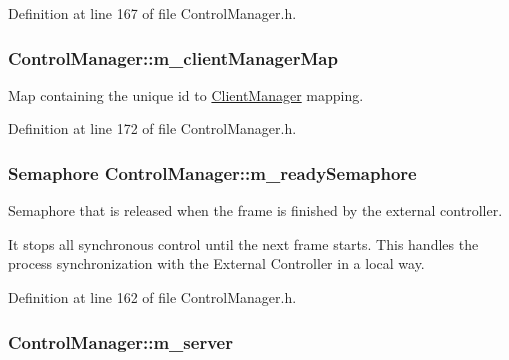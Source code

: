Definition at line 167 of file Control\-Manager.\-h.

\hypertarget{class_control_manager_af47dee5a077190c6aeb7b9ef3d9cfb3b}{
\subsubsection[{m\-\_\-client\-Manager\-Map}]{ Control\-Manager\-::m\-\_\-client\-Manager\-Map\hspace{0.3cm}{\ttfamily [private]}}}\label{class_control_manager_af47dee5a077190c6aeb7b9ef3d9cfb3b}


Map containing the unique id to \hyperlink{class_client_manager}{Client\-Manager} mapping. 



Definition at line 172 of file Control\-Manager.\-h.

\hypertarget{class_control_manager_ab718d2d17750dfea91411de871855075}{
\subsubsection[{m\-\_\-ready\-Semaphore}]{\setlength{\rightskip}{0pt plus 5cm}Semaphore Control\-Manager\-::m\-\_\-ready\-Semaphore\hspace{0.3cm}{\ttfamily [private]}}}\label{class_control_manager_ab718d2d17750dfea91411de871855075}


Semaphore that is released when the frame is finished by the external controller. 

It stops all synchronous control until the next frame starts. This handles the process synchronization with the External Controller in a local way. 

Definition at line 162 of file Control\-Manager.\-h.

\hypertarget{class_control_manager_a1b71eabaeddfd8ec80e503b734c72e9d}{
\subsubsection[{m\-\_\-server}]{ Control\-Manager\-::m\-\_\-server\hspace{0.3cm}{\ttfamily [private]}}}\label{class_control_manager_a1b71eabaeddfd8ec80e503b734c72e9d}


